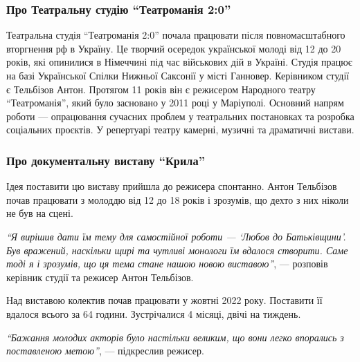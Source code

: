 
\subsubsection{Про Театральну студію \enquote{Театроманія 2:0}}

Театральна студія \enquote{Театроманія 2:0} почала працювати після повномасштабного
вторгнення рф в Україну. Це творчий осередок української молоді від 12 до 20
років, які опинилися в Німеччині під час військових дій в Україні. Студія
працює на базі Української Спілки Нижньої Саксонії у місті Ганновер. Керівником
студії є Тельбізов Антон. Протягом 11 років він є режисером Народного театру
\enquote{Театроманія}, який було засновано у 2011 році у Маріуполі. Основний напрям
роботи — опрацювання сучасних проблем у театральних постановках та розробка
соціальних проєктів. У репертуарі театру камерні, музичні та драматичні
вистави.


\subsubsection{Про документальну виставу \enquote{Крила}}

Ідея поставити цю виставу прийшла до режисера спонтанно. Антон Тельбізов почав
працювати з молоддю від 12 до 18 років і зрозумів, що дехто з них ніколи не був
на сцені.

\begin{leftbar}
\emph{\enquote{Я вирішив дати їм тему для самостійної роботи — \enquote{Любов до Батьківщини}. Був
вражений, наскільки щирі та чутливі монологи їм вдалося створити. Саме тоді я і
зрозумів, що ця тема стане нашою новою виставою}}, — розповів керівник студії та
режисер Антон Тельбізов.
\end{leftbar}


Над виставою колектив почав працювати у жовтні 2022 року. Поставити її вдалося
всього за 64 години. Зустрічалися 4 місяці, двічі на тиждень.

\begin{leftbar}
\emph{\enquote{Бажання молодих акторів було настільки великим, що вони легко впорались з поставленою метою}}, — підкреслив режисер.
\end{leftbar}

